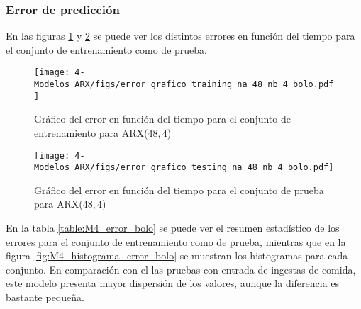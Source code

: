 \subsubsection*{Error de predicción}

En las figuras \ref{fig:M4_error_train_bolo} y \ref{fig:M4_error_test_bolo} se puede ver los distintos errores en función del tiempo para el conjunto de entrenamiento como de prueba.

\begin{figure}[H]
	\centering
	\texttt{[image: 4-Modelos\_ARX/figs/error\_grafico\_training\_na\_48\_nb\_4\_bolo.pdf]}
	\caption{Gráfico del error en función del tiempo para el conjunto de entrenamiento para ARX($48, 4$)}
	\label{fig:M4_error_train_bolo}
\end{figure}

\begin{figure}[H]
	\centering
	\texttt{[image: 4-Modelos\_ARX/figs/error\_grafico\_testing\_na\_48\_nb\_4\_bolo.pdf]}
	\caption{Gráfico del error en función del tiempo para el conjunto de prueba para ARX($48, 4$)}
	\label{fig:M4_error_test_bolo}
\end{figure}


En la tabla \ref{table:M4_error_bolo} se puede ver el resumen estadístico de los errores para el conjunto de entrenamiento como de prueba, mientras que en la figura \ref{fig:M4_histograma_error_bolo} se muestran los histogramas para cada conjunto. En comparación con el las pruebas con entrada de ingestas de comida, este modelo presenta mayor dispersión de los valores, aunque la diferencia es bastante pequeña.

